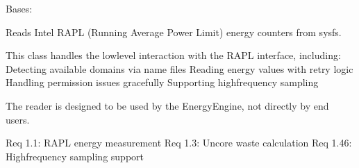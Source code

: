 \documentclass[letterpaper,10pt,english]{sphinxmanual}
\begin{document}
\begin{fulllineitems}
\label{\detokenize{core.readers.rapl_reader:core.readers.rapl_reader.RAPLReader}}
\pysigstartsignatures
\pysiglinewithargsret
{}
{}
{}
\pysigstopsignatures
\sphinxAtStartPar
Bases: 

\sphinxAtStartPar
Reads Intel RAPL (Running Average Power Limit) energy counters from sysfs.

\sphinxAtStartPar
This class handles the low\sphinxhyphen{}level interaction with the RAPL interface,
including:
\sphinxhyphen{} Detecting available domains via name files
\sphinxhyphen{} Reading energy values with retry logic
\sphinxhyphen{} Handling permission issues gracefully
\sphinxhyphen{} Supporting high\sphinxhyphen{}frequency sampling

\sphinxAtStartPar
The reader is designed to be used by the EnergyEngine, not directly
by end users.

\sphinxAtStartPar
Req 1.1: RAPL energy measurement
Req 1.3: Uncore waste calculation
Req 1.46: High\sphinxhyphen{}frequency sampling support

\begin{fulllineitems}
\label{\detokenize{core.readers.rapl_reader:core.readers.rapl_reader.RAPLReader.STANDARD_DOMAINS}}
\pysigstartsignatures
\pysigline
{}
\pysigstopsignatures
\end{fulllineitems}


\end{fulllineitems}
\end{document}
